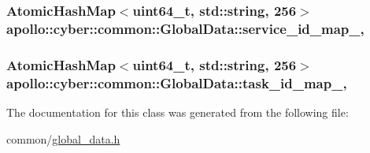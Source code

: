 \hypertarget{classapollo_1_1cyber_1_1common_1_1GlobalData_aa275354102633f341e7b639afcf90b2d}{
\subsubsection[{service\-\_\-id\-\_\-map\-\_\-}]{\setlength{\rightskip}{0pt plus 5cm}Atomic\-Hash\-Map$<$uint64\-\_\-t, std\-::string, 256$>$ apollo\-::cyber\-::common\-::\-Global\-Data\-::service\-\_\-id\-\_\-map\-\_\-\hspace{0.3cm}{\ttfamily [static]}, {\ttfamily [private]}}}\label{classapollo_1_1cyber_1_1common_1_1GlobalData_aa275354102633f341e7b639afcf90b2d}
\hypertarget{classapollo_1_1cyber_1_1common_1_1GlobalData_adac61bb03ae049915507e3f3e9077790}{
\subsubsection[{task\-\_\-id\-\_\-map\-\_\-}]{\setlength{\rightskip}{0pt plus 5cm}Atomic\-Hash\-Map$<$uint64\-\_\-t, std\-::string, 256$>$ apollo\-::cyber\-::common\-::\-Global\-Data\-::task\-\_\-id\-\_\-map\-\_\-\hspace{0.3cm}{\ttfamily [static]}, {\ttfamily [private]}}}\label{classapollo_1_1cyber_1_1common_1_1GlobalData_adac61bb03ae049915507e3f3e9077790}


The documentation for this class was generated from the following file\-:\begin{DoxyCompactItemize}
\item 
common/\hyperlink{global__data_8h}{global\-\_\-data.\-h}\end{DoxyCompactItemize}
